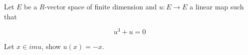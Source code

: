 Let $E$ be a $R$-vector space of finite dimension and $u: E \to E$ a linear map such that

\[u^3 + u = 0\]

Let $x \in im u$, show $u(x) = -x$.